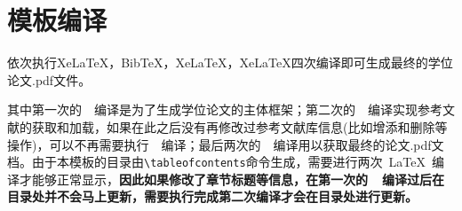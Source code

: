 \section{模板编译}
依次执行XeLaTeX，BibTeX，XeLaTeX，XeLaTeX四次编译即可生成最终的学位论文.pdf文件。

\par
其中第一次的~\XeLaTeX{}~编译是为了生成学位论文的主体框架；第二次的~\BibTeX{}~编译实现参考文献的获取和加载，如果在此之后没有再修改过参考文献库信息(比如增添和删除等操作)，可以不再需要执行~\BibTeX{}~编译；最后两次的~\XeLaTeX{}~编译用以获取最终的论文.pdf文档。由于本模板的目录由\verb|\tableofcontents|命令生成，需要进行两次~\LaTeX~编译才能够正常显示，\textbf{因此如果修改了章节标题等信息，在第一次的~\XeLaTeX{}~编译过后在目录处并不会马上更新，需要执行完成第二次编译才会在目录处进行更新。}